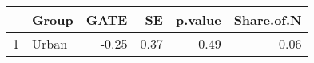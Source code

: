 \begin{tabular}{rlrrrr}
  \hline
 & Group & GATE & SE & p.value & Share.of.N \\ 
  \hline
1 & Urban & -0.25 & 0.37 & 0.49 & 0.06 \\ 
   \hline
\end{tabular}
